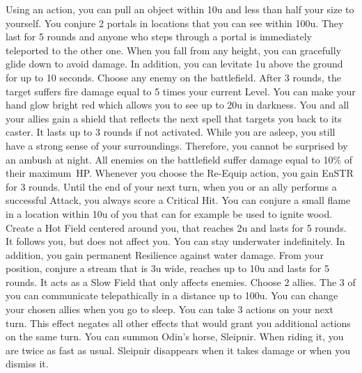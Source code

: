 %
\vfill
%
{Using an action, you can pull an object within 10u and less than half your size to yourself.}
{You conjure 2 portals in locations that you can see within 100u. They last for 5 rounds and anyone who steps through a portal is immediately teleported to the other one.}
%
\vfill
%
{When you fall from any height, you can gracefully glide down to avoid damage. In addition, you can levitate 1u above the ground for up to 10 seconds.}
{Choose any enemy on the battlefield. After 3 rounds, the target suffers fire damage equal to 5 times your current Level.}
%
\vfill
%
{You can make your hand glow bright red which allows you to see up to 20u in darkness.}
{You and all your allies gain a shield that reflects the next spell that targets you back to its caster. It lasts up to 3 rounds if not activated.}
%
\vfill
%
{While you are asleep, you still have a strong sense of your surroundings. Therefore, you cannot be surprised by an ambush at night.}
{All enemies on the battlefield suffer damage equal to 10\% of their maximum~HP.}
%
\vfill
%
{Whenever you choose the Re-Equip action, you gain EnSTR for 3 rounds.}
{Until the end of your next turn, when you or an ally performs a successful Attack, you always score a Critical Hit.}
%
\vfill
%
{You can conjure a small flame in a location within 10u of you that can for example be used to ignite wood.}
{Create a Hot Field centered around you, that reaches 2u and lasts for 5 rounds. It follows you, but does not affect you.}
%
\vfill
%
{You can stay underwater indefinitely. In addition, you gain permanent Resilience against water damage.}
{From your position, conjure a stream that is 3u wide, reaches up to 10u and lasts for 5 rounds. It acts as a Slow Field that only affects enemies.}
%
\vfill
%
{Choose 2 allies. The 3 of you can communicate telepathically in a distance up to 100u. You can change your chosen allies when you go to sleep.}
{You can take 3 actions on your next turn. This effect negates all other effects that would grant you additional actions on the same turn.}
%
\vfill
%
{You can summon Odin's horse, Sleipnir. When riding it, you are twice as fast as usual. Sleipnir disappears when it takes damage or when you dismiss it.}
